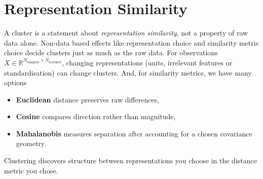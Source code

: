 \section{Representation Similarity}
\label{sec:Representation Similarity foundations}
A cluster is a statement about \emph{representation similarity}, not a property of raw data alone.
Non-data based effects like representation choice and similarity metric choice decide clusters just as much as the raw data.
For observations $X\in\mathbb R^{N_{\text{samples}}\times N_{\text{features}}}$, changing representations (units, irrelevant features or standardisation) can change clusters.
And, for similarity metrics, we have many options
\begin{itemize}
    \item \textbf{Euclidean} distance preserves raw differences,
    \item \textbf{Cosine} compares direction rather than magnitude, 
    \item \textbf{Mahalanobis} measures separation after accounting for a chosen covariance geometry.
\end{itemize}

\begin{calloutmemoryhook}
    Clustering discovers structure between representations you choose in the distance metric you chose.
\end{calloutmemoryhook}


